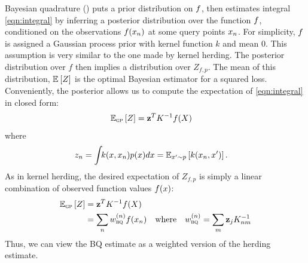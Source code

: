 \documentclass[]{article}
\begin{document}
Bayesian quadrature (\bq) puts a prior distribution on ${f}$, then estimates integral \eqref{eqn:integral} by inferring a posterior distribution over the function ${f}$, conditioned on the observations ${f}({x}_n)$ at some query points ${x}_n$.  For simplicity, ${f}$ is assigned a Gaussian process prior with kernel function $k$ and mean $0$.  This assumption is very similar to the one made by kernel herding.  The posterior distribution over $f$ then implies a distribution over $Z_{f,p}$. %
%
%
 The mean of this distribution, $\mathbb{E}_{} \left[ {Z} \right]$ is the optimal Bayesian estimator for a squared loss.
%
%
%
Conveniently, the \gp{} posterior allows us to compute the expectation of \eqref{eqn:integral} in closed form: 
%
\begin{align}
\mathbb{E}_{{\textsc{gp}}} \left[ {Z} \right] & = {\bf{z}}^T K^{-1} {f}({X})
\label{eq:marg_mean_symbolic}
\end{align} 
where
\begin{align}
z_n & = \int\!\! k({x}, {x}_n) p({x}) d{x} = \mathbb{E}_{{x}' \sim p} \left[ {k({x}_n, {x}')} \right].
\end{align}
%
As in kernel herding, the desired expectation of $Z_{f,p}$ is simply a linear combination of observed function values ${f}({x})$:
%
\begin{align}
\mathbb{E}_{{\textsc{gp}}} \left[ {Z} \right] & = {\bf{z}}^T K^{-1} {f}({X}) \\
    & = \sum_n w_{{\textsc{bq}}}^{(n)} f(x_n)  \quad \textrm{where} \quad w_{{\textsc{bq}}}^{(n)} = \sum_m {\bf{z}}_j K^{-1}_{nm}
\end{align}  
%
%
Thus, we can view the BQ estimate as a weighted version of the herding estimate.
\end{document}
